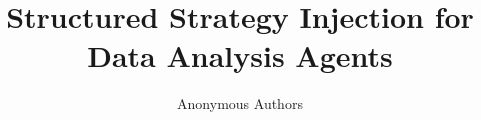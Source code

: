 \documentclass[11pt]{article}
\title{Structured Strategy Injection for Data Analysis Agents}
\author{%
  Anonymous Authors
}
\begin{document}

\maketitle


\FloatBarrier




































%
\nocite{*}


\clearpage

\end{document}
